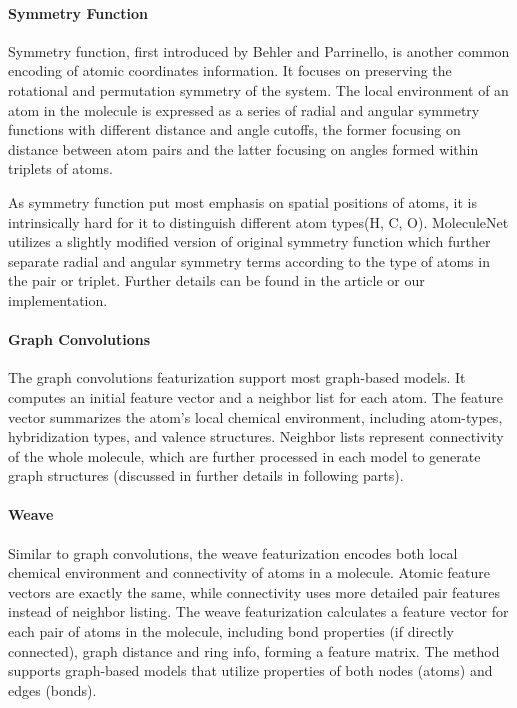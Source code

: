 \paragraph{Symmetry Function}

Symmetry function, first introduced by Behler and Parrinello\cite{SymmetryFunction}, is another common encoding of atomic coordinates information. It focuses on preserving the rotational and permutation symmetry of the system. The local environment of an atom in the molecule is expressed as a series of radial and angular symmetry functions  with different distance and angle cutoffs, the former focusing on distance between atom pairs and the latter focusing on angles formed within triplets of atoms. 

As symmetry function put most emphasis on spatial positions of atoms, it is intrinsically hard for it to distinguish different atom types(H, C, O). MoleculeNet utilizes a slightly modified version of original symmetry function\cite{ANI-1} which further separate radial and angular symmetry terms according to the type of atoms in the pair or triplet. Further details can be found in the article\cite{ANI-1} or our implementation.


\paragraph{Graph Convolutions}

The graph convolutions featurization support most graph-based models. It computes an initial feature vector and a neighbor list for each atom. The feature vector summarizes the atom's local chemical environment, including atom-types, hybridization types, and valence structures. Neighbor lists represent connectivity of the whole molecule, which are further processed in each model to generate graph structures (discussed in further details in following parts).

\paragraph{Weave}

Similar to graph convolutions, the weave featurization encodes both local chemical environment and connectivity of atoms in a molecule. Atomic feature vectors are exactly the same, while connectivity uses more detailed pair features instead of neighbor listing. The weave featurization calculates a feature vector for each pair of atoms in the molecule, including bond properties (if directly connected), graph distance and ring info, forming a feature matrix. The method supports graph-based models that utilize properties of both nodes (atoms) and edges (bonds).

